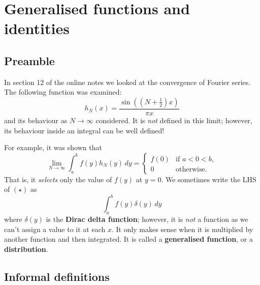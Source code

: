 \chapter{Generalised functions and identities}
\section{Preamble}
In section 12 of the online notes we looked at the convergence
of Fourier series.
The following function was examined:
\[
    h_N(x) = \frac{\sin\left(\left(N + \frac12\right)x\right)}{\pi x}
\]
and its behaviour as $N \to \infty$ considered.
It is \emph{not} defined in this limit;
however, its behaviour inside an integral can be well defined!

For example, it was shown that
\[
    \lim_{N \to \infty} \int_a^b f(y) h_N(y) \,dy =
    \begin{cases}
        f(0) & \text{if $a < 0 < b$}, \\
        0    & \text{otherwise}.
    \end{cases}
    \tag{$\star$}
\]
That is, it \emph{selects} only the value of $f(y)$ at $y = 0$.
We sometimes write the LHS of $(\star)$ as
\[
    \int_a^b f(y) \delta(y) \,dy
\]
where $\delta(y)$ is the \textbf{Dirac delta function};
however, it is \emph{not} a function as we can't assign a value
to it at each $x$.
It only makes sense when it is multiplied by another function
and then integrated.
It is called a \textbf{generalised function},
or a \textbf{distribution}.

\section{Informal definitions}

